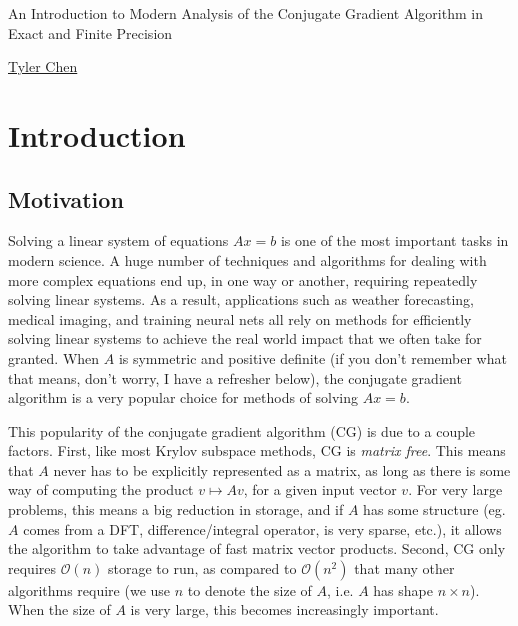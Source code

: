 \documentclass[10pt]{article}
\begin{document}
\begin{titlepage}
   \begin{center}
       \vspace{3em}
       \large
        
        {\sffamily\LARGE
        An Introduction to Modern Analysis of the Conjugate Gradient Algorithm in Exact and Finite Precision
        }
 
 
       \vspace{1.5cm}
 
       {\Large
        \href{https://chen.pw}{Tyler Chen}
       }
    \end{center}
\end{titlepage}


\section{Introduction}

\subsection{Motivation}

Solving a linear system of equations \(Ax=b\) is one of the most important tasks in modern science.
A huge number of techniques and algorithms for dealing with more complex equations end up, in one way or another, requiring repeatedly solving linear systems.
As a result, applications such as weather forecasting, medical imaging, and training neural nets all rely on methods for efficiently solving linear systems to achieve the real world impact that we often take for granted.
When \(A\) is symmetric and positive definite (if you don't remember what that means, don't worry, I have a refresher below), the conjugate gradient algorithm is a very popular choice for methods of solving \(Ax=b\).

This popularity of the conjugate gradient algorithm (CG) is due to a couple factors. First, like most Krylov subspace methods, CG is \emph{matrix free}.
This means that \(A\) never has to be explicitly represented as a matrix, as long as there is some way of computing the product \(v\mapsto Av\), for a given input vector \(v\).
For very large problems, this means a big reduction in storage, and if \(A\) has some structure (eg. \(A\) comes from a DFT, difference/integral operator, is very sparse, etc.), it allows the algorithm to take advantage of fast matrix vector products.
Second, CG only requires \(\mathcal{O}(n)\) storage to run, as compared to \(\mathcal{O}(n^2)\) that many other algorithms require (we use \(n\) to denote the size of \(A\), i.e. \(A\) has shape \(n\times n\)).
When the size of \(A\) is very large, this becomes increasingly important.
\end{document}
